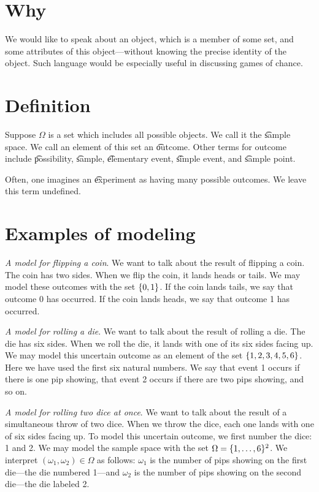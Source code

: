 
\section*{Why}

We would like to speak about an object, which is a member of some set, and some attributes of this object---without knowing the precise identity of the object.
Such language would be especially useful in discussing games of chance.

\section*{Definition}

Suppose $\Omega $ is a set which includes all possible objects.
We call it the \t{sample space}.
We call an element of this set an \t{outcome}.
Other terms for outcome include \t{possibility}, \t{sample}, \t{elementary event}, \t{simple event}, and \t{sample point}.

Often, one imagines an \t{experiment} as having many possible outcomes.
We leave this term undefined.

\section*{Examples of modeling}

\textit{A model for flipping a coin}.
We want to talk about the result of flipping a coin.
The coin has two sides.
When we flip the coin, it lands heads or tails.
We may model these outcomes with the set $\{0, 1\}$.
If the coin lands tails, we say that outcome 0 has occurred.
If the coin lands heads, we say that outcome 1 has occurred.

\textit{A model for rolling a die}.
We want to talk about the result of rolling a die.
The die has six sides.
When we roll the die, it lands with one of its six sides facing up.
We may model this uncertain outcome as an element of the set $\{1, 2, 3, 4, 5, 6\}$.
Here we have used the first six natural numbers.
We say that event 1 occurs if there is one pip showing, that event 2 occurs if there are two pips showing, and so on.

\textit{A model for rolling two dice at once}.
We want to talk about the result of a simultaneous throw of two dice.
When we throw the dice, each one lands with one of six sides facing up.
To model this uncertain outcome, we first number the dice: 1 and 2.
We may model the sample space with the set $\Omega  = \{1, \dots , 6\}^2$.
We interpret $(\omega _1, \omega _2) \in \Omega $ as follows: $\omega _1$ is the number of pips showing on the first die---the die numbered 1---and $\omega _2$ is the number of pips showing on the second die---the die labeled 2.

